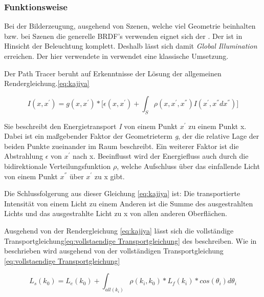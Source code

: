 \subsubsection{Funktionsweise}

Bei der Bilderzeugung, ausgehend von Szenen, welche viel Geometrie beinhalten bzw. bei Szenen 
die generelle BRDF's verwenden eignet sich der .
Der  ist in Hinsicht der Beleuchtung komplett. Deshalb lässt sich damit
\textit{Global Illumination} erreichen. Der hier verwendete  in 
\cite{Benty18} verwendet eine klassische Umsetzung.\par
Der Path Tracer beruht auf Erkenntnisse der Lösung der allgemeinen Rendergleichung.\ref{eq:kajiya}

\begin{equation}\label{eq:kajiya}
    I(x,{x}^{'}) = g(x,{x}^{'}) * \biggl[\epsilon(x,{x}^{'}) + 
    \int_{S}^{} \rho(x,{x}^{'},{x}^{''})
    I({x}^{'},{x}^{''}d{x}^{''})\biggr] 
\end{equation}

Sie beschreibt den Energietransport \textit{I} von einem Punkt ${x}^{'}$
zu einem Punkt x. Dabei ist ein maßgebender Faktor der Geometrieterm \textit{g},
der die relative Lage der beiden Punkte zueinander im Raum beschreibt.
Ein weiterer Faktor ist die Abstrahlung \textit{$\epsilon$} von ${x}^{'}$ nach x. 
Beeinflusst wird der Energiefluss auch durch
die bidirektionale Verteilungsfunktion \textit{$\rho$}, welche Aufschluss über
das einfallende Licht von einem Punkt ${x}^{''}$ über ${x}^{'}$ zu x gibt.\par
Die Schlussfolgerung aus dieser Gleichung \ref{eq:kajiya} ist: Die transportierte
Intensität von einem Licht zu einem Anderen ist die Summe des ausgestrahlten Lichts 
und das ausgestrahlte Licht zu x von allen anderen Oberflächen.

Ausgehend von der Rendergleichung \ref{eq:kajiya} lässt sich
die vollständige Transportgleichung\ref{eq:vollstaendige Transportgleichung} des 
beschreiben.
Wie in \cite{marschner2009fundamentals} beschrieben wird ausgehend von der vollständigen Transportgleichung
\ref{eq:vollstaendige Transportgleichung}

\begin{equation}\label{eq:vollstaendige Transportgleichung}
    L_s(k_0) = L_e(k_0) + \int_{all(k_i)}^{} \rho(k_i, k_0)*L_f(k_i)*cos(\theta_i)d\theta_i
\end{equation}

